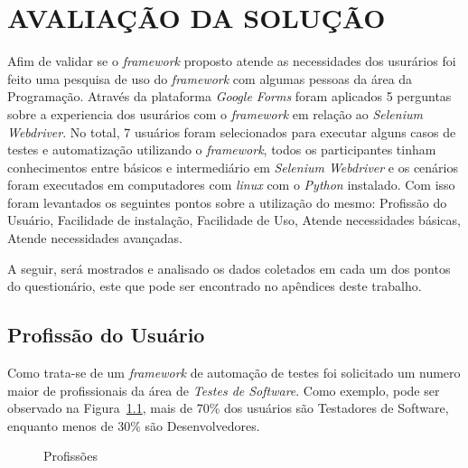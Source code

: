 
\chapter{AVALIAÇÃO DA SOLUÇÃO}\label{chap:result}

    Afim de validar se o \emph{framework} proposto atende as necessidades dos usurários foi feito uma pesquisa de uso do \emph{framework} com algumas pessoas da área da Programação.
    Através da plataforma \emph{Google Forms} foram aplicados 5 perguntas sobre a experiencia dos usurários com o \emph{framework} em relação ao \emph{Selenium Webdriver}.
    No total, 7 usuários foram selecionados para executar alguns casos de testes e automatização utilizando o \emph{framework}, todos os participantes tinham conhecimentos entre
    básicos e intermediário em \emph{Selenium Webdriver} e os cenários foram executados em computadores com \emph{linux} com o \emph{Python} instalado.
    Com isso foram levantados os seguintes pontos sobre a utilização do mesmo:
    Profissão do Usuário,
    Facilidade de instalação,
    Facilidade de Uso,
    Atende necessidades básicas,
    Atende necessidades avançadas.

    A seguir, será mostrados e analisado os dados coletados em cada um dos pontos do questionário, este que pode ser encontrado no apêndices deste trabalho.

    \section{Profissão do Usuário}
        Como trata-se de um \emph{framework} de automação de testes foi solicitado um numero maior de profissionais da área de \emph{Testes de Software}.
        Como exemplo, pode ser observado na Figura~\ref{fig:profissao}, mais de 70\% dos usuários são Testadores de Software, enquanto menos de 30\% são
        Desenvolvedores.

        \begin{figure}[H]
            \vspace*{0,2cm}
            \centering
            \caption{Profissões}
            \label{fig:profissao}
        \end{figure}
        \vspace*{-0,9cm}
        {\raggedright {}}

